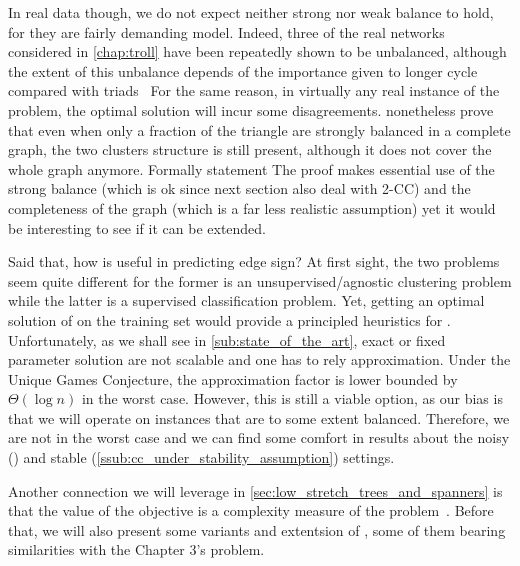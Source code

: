 In real data though, we do not expect neither strong nor weak balance to hold, for they are fairly
demanding model. Indeed, three of the real networks considered in \autoref{chap:troll} have been
repeatedly shown to be unbalanced, although the extent of this unbalance depends of the importance
given to longer cycle compared with triads~\autocites{Facchetti2011isingmodel}{measureUnbalance14}%
{measureUnbalance17} For the same reason, in virtually any real instance of the \pcc{} problem, the%
optimal solution will incur some disagreements. \Textcite[Section 5.5]{BookKleinberg2010}
nonetheless prove that even when only a fraction of the triangle are strongly balanced in a complete
graph, the two clusters structure is still present, although it does not cover the whole graph
anymore. Formally statement
The proof makes essential use of the strong balance (which is ok since next section also deal with
2-CC) and the completeness of the graph (which is a far less realistic assumption) yet it would be
interesting to see if it can be extended.

Said that, how is \pcc{} useful in predicting edge sign? At first sight, the two problems seem quite
different for the former is an unsupervised/agnostic clustering problem while the latter is a
supervised classification problem. Yet, getting an optimal solution of \pcc{} on the training set
would provide a principled heuristics for \esp{}. Unfortunately, as we shall see in
\autoref{sub:state_of_the_art}, exact or fixed parameter solution are not scalable and one has to
rely approximation. Under the Unique Games Conjecture, the approximation factor is lower bounded by
$\Theta(\log n)$ in the worst case. However, this is still a viable option, as our bias is that we
will operate on instances that are to some extent balanced. Therefore, we are not in the worst case
and we can find some comfort in results about the noisy () and
stable (\autoref{ssub:cc_under_stability_assumption}) settings.

Another connection we will leverage in \autoref{sec:low_stretch_trees_and_spanners} is that the
value of the \mind{} objective is a complexity measure of the \esp{} problem~\autocite[Section
4.1]{Cesa-Bianchi2012b}. Before that, we will also present some variants and extentsion of \pcc{},
some of them bearing similarities with the Chapter 3's problem.


